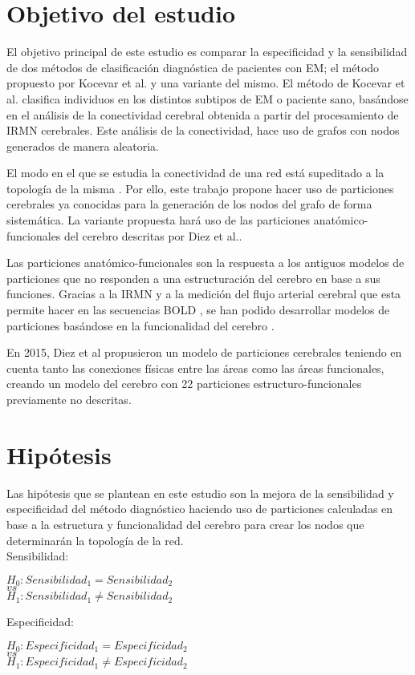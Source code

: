 \documentclass[fleqn,12pt]{UICArticle} %
\begin{document}
\section{Objetivo del estudio}

El objetivo principal de este estudio es comparar la especificidad y la sensibilidad de dos métodos de clasificación diagnóstica de pacientes con EM; el método propuesto por Kocevar et al.\cite{Kocevar2016} y una variante del mismo. El método de Kocevar et al.\cite{Kocevar2016} clasifica individuos en los distintos subtipos de EM o paciente sano, basándose en el análisis de la conectividad cerebral obtenida a partir del procesamiento de IRMN cerebrales. Este análisis de la conectividad, hace uso de grafos con nodos generados de manera aleatoria.

El modo en el que se estudia la conectividad de una red está supeditado a la topología de la misma \cite{Fornito, Zalesky2010}. Por ello, este trabajo propone hacer uso de particiones cerebrales ya conocidas para la generación de los nodos del grafo de forma sistemática. La variante propuesta hará uso de las particiones anatómico-funcionales del cerebro descritas por Diez et al.\cite{Diez2015}.

Las particiones anatómico-funcionales son la respuesta a los antiguos modelos de particiones que no responden a una estructuración del cerebro en base a sus funciones. Gracias a la IRMN y a la medición del flujo arterial cerebral que esta permite hacer en las secuencias BOLD \cite{Ogawa1990}, se han podido desarrollar modelos de particiones basándose en la funcionalidad del cerebro \cite{Heller2006}.

En 2015, Diez et al \cite{Diez2015} propusieron un modelo de particiones cerebrales teniendo en cuenta tanto las conexiones físicas entre las áreas como las áreas funcionales, creando un modelo del cerebro con 22 particiones estructuro-funcionales previamente no descritas. 


\section{Hipótesis}

Las hipótesis que se plantean en este estudio son la mejora de la sensibilidad y especificidad del método diagnóstico haciendo uso de particiones calculadas en base a la estructura y funcionalidad del cerebro para crear los nodos que determinarán la topología de la red. 
\vspace{1em} \\
Sensibilidad:
\begin{center}
$H_0: Sensibilidad_1 = Sensibilidad_2$ \\
$vs$ \\
$H_1: Sensibilidad_1 \neq Sensibilidad_2$
\end{center}
Especificidad:
\begin{center}
$H_0: Especificidad_1 = Especificidad_2$ \\
$vs$ \\
$H_1: Especificidad_1 \neq Especificidad_2$
\end{center}
\end{document}
